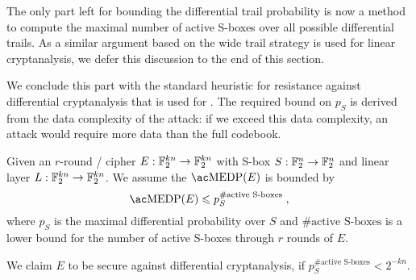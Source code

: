 The only part left for bounding the differential trail probability is now a method to compute the maximal number of active S-boxes over all possible differential trails.
As a similar argument based on the wide trail strategy is used for linear cryptanalysis, we defer this discussion to the end of this section.

We conclude this part with the standard heuristic for resistance against differential cryptanalysis that is used for .
The required bound on $p_S$ is derived from the data complexity of the attack: if we exceed this data complexity, an attack would require more data than the full codebook.
\begin{heuristic}\label{heu:dc}
    Given an $r$-round \SPN/ cipher $E : \mathbb{F}_2^{kn} \to \mathbb{F}_2^{kn}$ with S-box $S : \mathbb{F}_2^n \to \mathbb{F}_2^n$ and linear layer $L : \mathbb{F}_2^{kn} \to \mathbb{F}_2^{kn}$.
    We assume the $\mathrm{\MEDP/}(E)$ is bounded by
    \begin{equation*}
        \mathrm{\MEDP/}(E) \leqslant p_S^{\text{\#active S-boxes}}\;,
    \end{equation*}
    where $p_S$ is the maximal differential probability over $S$ and $\text{\#active S-boxes}$ is a lower bound for the number of active S-boxes through $r$ rounds of $E$.

    We claim $E$ to be secure against differential cryptanalysis, if $p_S^{\text{\#active S-boxes}} < 2^{-kn}$.
\end{heuristic}

